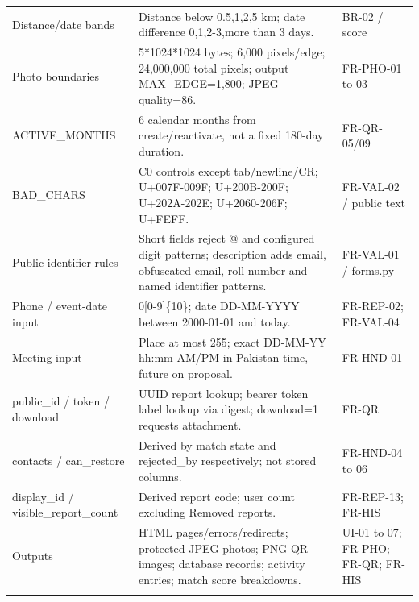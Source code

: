 \documentclass[12pt,a4paper,oneside]{report}
\begin{document}
\begin{longtable}{@{}P{0.27\dimexpr\textwidth-24pt\relax}P{0.4\dimexpr\textwidth-24pt\relax}P{0.33\dimexpr\textwidth-24pt\relax}@{}}
Distance/date bands & Distance below 0.5,1,2,5 km; date difference 0,1,2-3,more than 3 days. & BR-02 / score \\ \addlinespace[3pt]

Photo boundaries & 5*1024*1024 bytes; 6,000 pixels/edge; 24,000,000 total pixels; output MAX\_EDGE=1,800; JPEG quality=86. & FR-PHO-01 to 03 \\ \addlinespace[3pt]

ACTIVE\_MONTHS & 6 calendar months from create/reactivate, not a fixed 180-day duration. & FR-QR-05/09 \\ \addlinespace[3pt]

BAD\_CHARS & C0 controls except tab/newline/CR; U+007F-009F; U+200B-200F; U+202A-202E; U+2060-206F; U+FEFF. & FR-VAL-02 / public text \\ \addlinespace[3pt]

Public identifier rules & Short fields reject @ and configured digit patterns; description adds email, obfuscated email, roll number and named identifier patterns. & FR-VAL-01 / forms.py \\ \addlinespace[3pt]

Phone / event-date input & 0[0-9]\{10\}; date DD-MM-YYYY between 2000-01-01 and today. & FR-REP-02; FR-VAL-04 \\ \addlinespace[3pt]

Meeting input & Place at most 255; exact DD-MM-YY hh:mm AM/PM in Pakistan time, future on proposal. & FR-HND-01 \\ \addlinespace[3pt]

public\_id / token / download & UUID report lookup; bearer token label lookup via digest; download=1 requests attachment. & FR-QR \\ \addlinespace[3pt]

contacts / can\_restore & Derived by match state and rejected\_by respectively; not stored columns. & FR-HND-04 to 06 \\ \addlinespace[3pt]

display\_id / visible\_report\_count & Derived report code; user count excluding Removed reports. & FR-REP-13; FR-HIS \\ \addlinespace[3pt]

Outputs & HTML pages/errors/redirects; protected JPEG photos; PNG QR images; database records; activity entries; match score breakdowns. & UI-01 to 07; FR-PHO; FR-QR; FR-HIS \\ \addlinespace[3pt]

\end{longtable}
\end{document}
